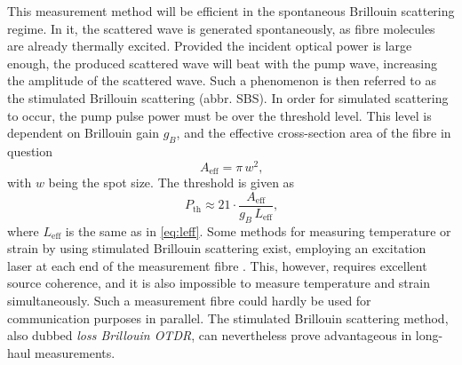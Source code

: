 \documentclass{standalone}
\begin{document}
This measurement method will be efficient in the spontaneous Brillouin scattering regime. In it, the scattered wave is generated spontaneously, as fibre molecules are already thermally excited. Provided the incident optical power is large enough, the produced scattered wave will beat with the pump wave, increasing the amplitude of the scattered wave. Such a phenomenon is then referred to as the stimulated Brillouin scattering (abbr. SBS). In order for simulated scattering to occur, the pump pulse power must be over the threshold level. This level is dependent on Brillouin gain $g_B$, and the effective cross-section area of the fibre in question 
\begin{equation}
A_\textrm{eff} = \pi \, w^2 \textrm{,}
\end{equation}
with $w$ being the spot size. The threshold is given as
\begin{equation}
P_\textrm{th} \approx 21 \cdot \frac{A_\textrm{eff}}{g_B \, L_\textrm{eff}} \textrm{,}
\end{equation}
where $L_\textrm{eff}$ is the same as in \ref{eq:leff}. Some methods for measuring temperature or strain by using stimulated Brillouin scattering exist, employing an excitation laser at each end of the measurement fibre \cite{Rogers1999}. This, however, requires excellent source coherence, and it is also impossible to measure temperature and strain simultaneously. Such a measurement fibre could hardly be used for communication purposes in parallel. The stimulated Brillouin scattering method, also dubbed \textit{loss Brillouin OTDR}, can nevertheless prove advantageous in long-haul measurements.
\end{document}
